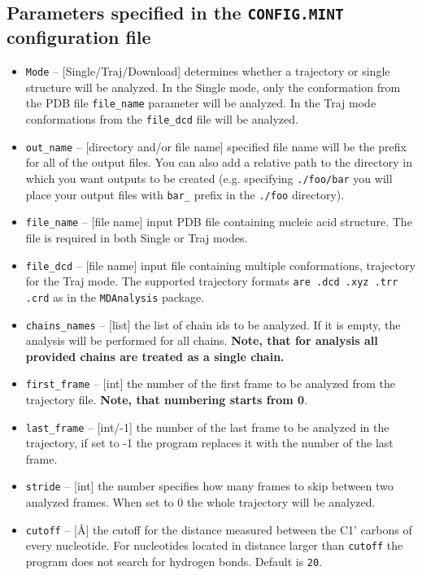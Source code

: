 \documentclass[12pt]{article}
\begin{document}
\subsection{Parameters specified in the {\tt CONFIG.MINT} configuration file}
\begin{itemize}
\item {\tt Mode} -- [Single/Traj/Download] determines whether a trajectory or  single structure %
will be analyzed. In the Single mode, only the conformation from the PDB file {\tt file\_name} parameter will be analyzed. In the Traj mode conformations from the {\tt file\_dcd} file will be analyzed. 
\item {\tt out\_name} -- [directory and/or file name] specified file name will be the prefix for all of the output files. You can also add a relative path to the directory in which you want outputs to be created (e.g. specifying {\tt ./foo/bar} you will place your output files with {\tt bar\_} prefix in the {\tt ./foo} directory).
\item {\tt file\_name} -- [file name] input PDB file containing nucleic acid structure. The file is required in both Single or Traj modes.
\item {\tt file\_dcd} -- [file name] input file containing multiple conformations, trajectory for the Traj mode. The supported trajectory formats {\tt are .dcd .xyz .trr .crd} as in the {\tt MDAnalysis} package.  
\item {\tt chains\_names} -- [list] the list of chain ids to be analyzed. If it is empty, the analysis will be performed for all chains. \textbf{Note, that for analysis all provided chains are treated as a single chain.}
\item {\tt first\_frame} -- [int] the number of the first frame to be analyzed from the trajectory file. {\bf Note, that numbering starts from 0}.
\item {\tt last\_frame} -- [int/-1] the number of the last frame to be analyzed in the trajectory, if set to -1 the program replaces it with the number of the last frame.
\item {\tt stride} -- [int] the number specifies how many frames to skip between two analyzed frames. When set to 0 the whole trajectory will be analyzed. 
\item {\tt cutoff} -- [\AA] the cutoff for the distance measured between the C1' carbons of every nucleotide. For nucleotides located in distance larger than {\tt cutoff} the program does not search for hydrogen bonds. Default is {\tt 20}.

\end{itemize}
\end{document}
